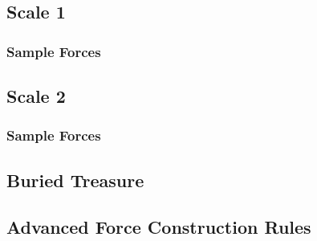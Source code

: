 

\subsection{Scale 1}
\label{subsec:force_construction_scale_1}



\subsubsection{Sample Forces}
\label{subsec:sample_commands_scale_1}



\subsection{Scale 2}
\label{subsec:force_construction_scale_2}



\subsubsection{Sample Forces}
\label{subsec:sample_commands_scale_2}



\newpage

\subsection{Buried Treasure}



\newpage

\subsection{Advanced Force Construction Rules}





\newpage
